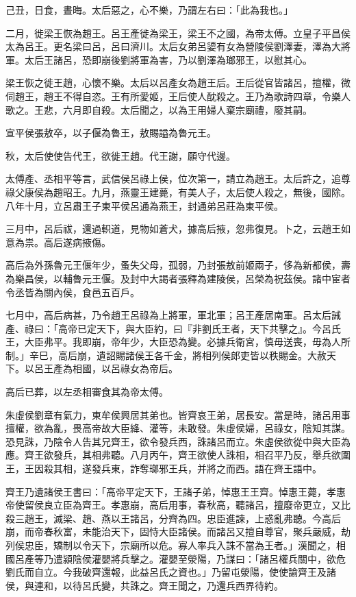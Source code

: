 \begin{pinyinscope}
己丑，日食，晝晦。太后惡之，心不樂，乃謂左右曰：「此為我也。」

二月，徙梁王恢為趙王。呂王產徙為梁王，梁王不之國，為帝太傅。立皇子平昌侯太為呂王。更名梁曰呂，呂曰濟川。太后女弟呂媭有女為營陵侯劉澤妻，澤為大將軍。太后王諸呂，恐即崩後劉將軍為害，乃以劉澤為瑯邪王，以慰其心。

梁王恢之徙王趙，心懷不樂。太后以呂產女為趙王后。王后從官皆諸呂，擅權，微伺趙王，趙王不得自恣。王有所愛姬，王后使人酖殺之。王乃為歌詩四章，令樂人歌之。王悲，六月即自殺。太后聞之，以為王用婦人棄宗廟禮，廢其嗣。

宣平侯張敖卒，以子偃為魯王，敖賜謚為魯元王。

秋，太后使使告代王，欲徙王趙。代王謝，願守代邊。

太傅產、丞相平等言，武信侯呂祿上侯，位次第一，請立為趙王。太后許之，追尊祿父康侯為趙昭王。九月，燕靈王建薨，有美人子，太后使人殺之，無後，國除。八年十月，立呂肅王子東平侯呂通為燕王，封通弟呂莊為東平侯。

三月中，呂后祓，還過軹道，見物如蒼犬，據高后掖，忽弗復見。卜之，云趙王如意為祟。高后遂病掖傷。

高后為外孫魯元王偃年少，蚤失父母，孤弱，乃封張敖前姬兩子，侈為新都侯，壽為樂昌侯，以輔魯元王偃。及封中大謁者張釋為建陵侯，呂榮為祝茲侯。諸中宦者令丞皆為關內侯，食邑五百戶。

七月中，高后病甚，乃令趙王呂祿為上將軍，軍北軍；呂王產居南軍。呂太后誡產、祿曰：「高帝已定天下，與大臣約，曰『非劉氏王者，天下共擊之』。今呂氏王，大臣弗平。我即崩，帝年少，大臣恐為變。必據兵衛宮，慎毋送喪，毋為人所制。」辛巳，高后崩，遺詔賜諸侯王各千金，將相列侯郎吏皆以秩賜金。大赦天下。以呂王產為相國，以呂祿女為帝后。

高后已葬，以左丞相審食其為帝太傅。

朱虛侯劉章有氣力，東牟侯興居其弟也。皆齊哀王弟，居長安。當是時，諸呂用事擅權，欲為亂，畏高帝故大臣絳、灌等，未敢發。朱虛侯婦，呂祿女，陰知其謀。恐見誅，乃陰令人告其兄齊王，欲令發兵西，誅諸呂而立。朱虛侯欲從中與大臣為應。齊王欲發兵，其相弗聽。八月丙午，齊王欲使人誅相，相召平乃反，舉兵欲圍王，王因殺其相，遂發兵東，詐奪瑯邪王兵，并將之而西。語在齊王語中。

齊王乃遺諸侯王書曰：「高帝平定天下，王諸子弟，悼惠王王齊。悼惠王薨，孝惠帝使留侯良立臣為齊王。孝惠崩，高后用事，春秋高，聽諸呂，擅廢帝更立，又比殺三趙王，滅梁、趙、燕以王諸呂，分齊為四。忠臣進諫，上惑亂弗聽。今高后崩，而帝春秋富，未能治天下，固恃大臣諸侯。而諸呂又擅自尊官，聚兵嚴威，劫列侯忠臣，矯制以令天下，宗廟所以危。寡人率兵入誅不當為王者。」漢聞之，相國呂產等乃遣潁陰侯灌嬰將兵擊之。灌嬰至滎陽，乃謀曰：「諸呂權兵關中，欲危劉氏而自立。今我破齊還報，此益呂氏之資也。」乃留屯滎陽，使使諭齊王及諸侯，與連和，以待呂氏變，共誅之。齊王聞之，乃還兵西界待約。


\end{pinyinscope}

